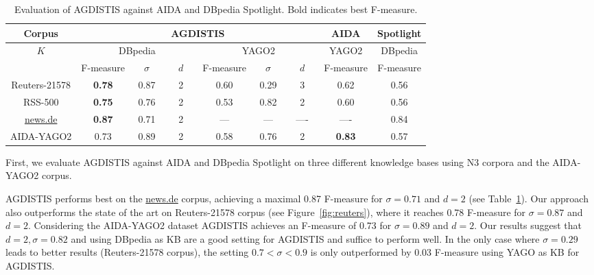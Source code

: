 \begin{table}[hb!]
\centering
\caption{Evaluation of AGDISTIS against AIDA and DBpedia Spotlight. Bold indicates best \mbox{F-measure}.} \label{tab:evalold} 
\begin{tabular}{c ccc ccc c c}
\toprule
\textbf{Corpus}  & \multicolumn{6}{c}{\textbf{AGDISTIS}}	& \textbf{AIDA} & \textbf{Spotlight}\\\midrule
\textbf{$K$}& \multicolumn{3}{c}{{DBpedia}}& \multicolumn{3}{c}{{YAGO2}}	& {YAGO2} & {DBpedia}\\\midrule
				& \mbox{F-measure} 		& $\quad \sigma \quad $ & $\quad d \quad $ 	& \mbox{F-measure} & $\quad \sigma \quad $ & $\quad d \quad $ & \mbox{F-measure}  & \mbox{F-measure}\\
\cmidrule(r){2-4}  \cmidrule(r){5-7} \cmidrule{8-8} \cmidrule{9-9}
Reuters-21578	&  	\textbf{0.78}	&  			0.87		&  		2		& 	0.60	&  0.29		&  	3	&  	0.62		& 	0.56	\\
RSS-500 		&  	\textbf{0.75}	&  			0.76		&  		2		& 	0.53	&  0.82		&   2 	&  	0.60		& 	0.56	\\
\url{news.de} 	&  	\textbf{0.87}	&  			0.71		&  		2		& 	---		&   ---		&  ----	&  	----		& 	0.84	\\
AIDA-YAGO2	   	&  		0.73		&  			0.89		&  		2		& 	0.58	&  0.76		&   2 	&\textbf{0.83}	& 	0.57	\\
\bottomrule
\end{tabular}
\end{table}

First, we evaluate AGDISTIS against AIDA and DBpedia Spotlight on three different knowledge bases using N3 corpora and the AIDA-YAGO2 corpus. 

AGDISTIS performs best on the \url{news.de} corpus, achieving a maximal 0.87 \mbox{F-measure} for $\sigma = 0.71$ and $d = 2$ (see Table~\ref{tab:evalold}).
Our approach also outperforms the state of the art on Reuters-21578 corpus (see Figure~\ref{fig:reuters}), where it reaches 0.78 \mbox{F-measure} for $\sigma = 0.87$ and $d = 2$.
Considering the AIDA-YAGO2 dataset AGDISTIS achieves an \mbox{F-measure} of 0.73 for $\sigma = 0.89$ and $d = 2$.
Our results suggest that $d=2, \sigma=0.82$ and using DBpedia as \ac{KB} are a good setting for AGDISTIS and suffice to perform well. %
In the only case where $\sigma=0.29$ leads to better results (Reuters-21578 corpus), the setting $0.7<\sigma<0.9$ is only outperformed by 0.03 F-measure using YAGO as \ac{KB} for AGDISTIS.


